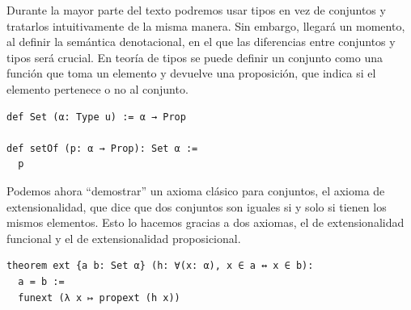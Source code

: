 \documentclass[../main.tex]{subfiles}
\begin{document}
Durante la mayor parte del texto podremos usar tipos en vez de conjuntos y
tratarlos intuitivamente de la misma manera. Sin embargo, llegará un momento,
al definir la semántica denotacional, en el que las diferencias entre conjuntos
y tipos será crucial.
En teoría de tipos se puede definir un conjunto como una función que toma un
elemento y devuelve una proposición, que indica si el elemento pertenece o no al
conjunto.

\begin{verbatim}
def Set (α: Type u) := α → Prop

def setOf (p: α → Prop): Set α :=
  p
\end{verbatim}


Podemos ahora \enquote{demostrar} un axioma clásico para conjuntos, el 
axioma de extensionalidad, que dice que dos conjuntos son iguales si y solo si
tienen los mismos elementos. Esto lo hacemos gracias a dos axiomas,
el de extensionalidad funcional y el de extensionalidad proposicional.

\begin{verbatim}
theorem ext {a b: Set α} (h: ∀(x: α), x ∈ a ↔ x ∈ b):
  a = b :=
  funext (λ x ↦ propext (h x))
\end{verbatim}
\end{document}
